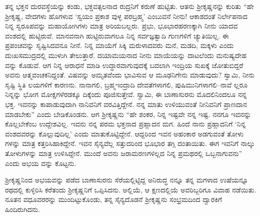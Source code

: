 ತನ್ನ ಭಕ್ತನ ದುರವಸ್ಥೆಯನ್ನು ಕಂಡು, ಭಕ್ತವತ್ಸಲನಾದ ರುದ್ರನಿಗೆ ಕರುಣೆ ಹುಟ್ಟಿತು. ಆತನು ಶ್ರೀಕೃಷ್ಣನನ್ನು ಕುರಿತು “ಹೇ ಶ್ರೀಕೃಷ್ಣ, ವೇದಗಳು ಹೊಗಳುವ ‘ಸ್ವಯಂ ಪ್ರಕಾಶ ವುಳ್ಳ ಪರಬ್ರಹ್ಮ’ ಎಂಬುವನೆ ನೀನು! ಆಕಾಶದಂತೆ ನಿರ್ಲೇಪನಾದ ನಿನ್ನ ಸ್ವರೂಪವನ್ನು ಮಹಾಯೋಗಿಗಳು ಮಾತ್ರ ಅರಿಯಬಲ್ಲರು. ಪ್ರಭು, ಭೂಭಾರಹರಣಕ್ಕಾಗಿ ನೀನು ಯಾದವ ವಂಶದಲ್ಲಿ ಹುಟ್ಟಿರುವೆ. ಮಾನವನಾಗಿ ಹುಟ್ಟಿರುವಾಗಲೂ ನಿನ್ನ ಸರ್ವಜ್ಞತ್ವಾದಿ ಗುಣಗಳಿಗೆ ಚ್ಯುತಿಯಿಲ್ಲ. ಈ ಪ್ರಪಂಚವನ್ನು ಸೃಷ್ಟಿಸಿದವನೂ ನೀನೆ. ನಿನ್ನ ಮಾಯೆಗೆ ಸಿಕ್ಕಿ ಮರುಳಾದವರು ಮನೆ, ಮಡದಿ, ಮಕ್ಕಳು ಎಂದು ದುಃಖಸಮುದ್ರದಲ್ಲಿ ಮುಳುಗಿ ತೇಲುತ್ತಾರೆ. ದಯಾಮಯನಾದ ನೀನು ಮಾಯೆಯನ್ನು ದಾಟಲೆಂದು ಮನುಷ್ಯದೇಹ ವನ್ನು ಕೊಡುವೆ. ಆಗ ನಿನ್ನ ಆರಾಧನೆ ಮಾಡಿ ಉದ್ಧಾರವಾಗುವುದಕ್ಕೆ ಬದಲಾಗಿ ಇಂದ್ರಿಯ ಸುಖಕ್ಕೆ ಜೋತುಬಿದ್ದರೆ ಅವನು ಆತ್ಮವಂಚಕನಿದ್ದಂತೆ. ವಿಷವನ್ನು ಅಮೃತವೆಂದು ಭಾವಿಸುವ ಆ ಮೂಢನಿಗೇನು ಮಾಡುವುದು? ಸ್ವಾಮಿ, ನೀನು ಸೃಷ್ಟಿ ಸ್ಥಿತಿ ಲಯಗಳಿಗೆ ಕಾರಣನು. ನಾನಾಗಲಿ, ಬ್ರಹ್ಮಇಂದ್ರಾದಿ ದೇವತೆಗಳಾಗಲಿ, ಪುಷಿಮುನಿಗಳಾಗಲಿ–ನಾವೆ ಲ್ಲರೂ ನಿನ್ನನ್ನು ಭೋಗ ಮೋಕ್ಷಗಳೆರಡಕ್ಕೂ ದಿಕ್ಕೆಂದು ಪೂಜಿಸುತ್ತೇವೆ. ಸ್ವಾಮಿ, ಈ ಬಾಣಾಸುರನು ಮೊದಲಿನಿಂದಲೂ ನನ್ನ ಭಕ್ತ. ಇವನನ್ನು ಕಾಪಾಡುವುದಾಗಿ ನಾನಿವನಿಗೆ ವರವಿತ್ತಿದ್ದೇನೆ. ನನ್ನ ಮಾತು ಉಳಿಯುವಂತೆ ನೀನಿವನಿಗೆ ಪ್ರಾಣದಾನ ಮಾಡಬೇಕು” ಎಂದು ಬೇಡಿಕೊಂಡನು. ಆಗ ಶ್ರೀಕೃಷ್ಣನು “ಹೇ ಶಂಕರ, ನಿನ್ನ ಇಷ್ಟವೇ ನನ್ನ ಇಷ್ಟ. ನನಗೂ ಇವನನ್ನು ಕೊಲ್ಲಬೇಕೆಂಬ ಉದ್ದೇಶವಿಲ್ಲ. ಇವನು ನನ್ನ ಪರಮ ಭಕ್ತನಾದ ಪ್ರಹ್ಲಾದನ ಮಗ. ಹಿಂದೆ ನಾನು ಪ್ರಹ್ಲಾದನಿಗೆ ‘ನಿನ್ನ ವಂಶದವರನ್ನು ಕೊಲ್ಲುವುದಿಲ್ಲ’ ಎಂದು ಮಾತುಕೊಟ್ಟಿದ್ದೇನೆ. ಆದ್ದರಿಂದ ಇವನ ಅಹಂಕಾರ ಅಡಗುವಂತೆ ತೋಳು ಗಳನ್ನು ಮಾತ್ರ ಕತ್ತರಿಸಿಹಾಕಿದ್ದೇನೆ. ಇವನ ಸೈನ್ಯವೆಲ್ಲ ಸತ್ತುದರಿಂದ ಭೂಭಾರ ತಗ್ಗಿ ದಂತಾಯಿತು. ಈಗ ಇವನಿಗೆ ನಾಲ್ಕು ತೋಳುಗಳನ್ನು ಮಾತ್ರ ಉಳಿಸಿದ್ದೇನೆ. ಮುಂದೆ ಅವನು ಜರಾಮರಣಗಳಿಲ್ಲದ ನಿನ್ನ ಪ್ರಮಥರಲ್ಲಿ ಒಬ್ಬನಾಗುವನು” ಎಂದು ಅಭಯ ವನ್ನು ಕೊಟ್ಟನು.

ಶ್ರೀಕೃಷ್ಣನಿಂದ ಅಭಯವನ್ನು ಪಡೆದ ಬಾಣಾಸುರನು ಸೆರೆಯಲ್ಲಿಟ್ಟಿದ್ದ ಅನಿರುದ್ಧ ನನ್ನೂ ತನ್ನ ಮಗಳಾದ ಉಷೆಯನ್ನೂ ರಥದಲ್ಲಿ ಕುಳ್ಳಿರಿಸಿ ಕರೆತಂದು ಶ್ರೀಕೃಷ್ಣನಿಗೆ ಒಪ್ಪಿಸಿದನು. ಅಲ್ಲಿಯೆ, ಆ ಕ್ಷಣದಲ್ಲಿಯೆ ಅವರಿಬ್ಬರಿಗೂ ವಿವಾಹ ನಡೆಯಿತು. ನೂತನ ವಧೂವರರನ್ನು ಮುಂದಿಟ್ಟುಕೊಂಡು, ತನ್ನ ಸೈನ್ಯದೊಡನೆ ಶ್ರೀಕೃಷ್ಣನು ಸಂಭ್ರಮದಿಂದ ದ್ವಾರಕಿಗೆ ಹಿಂದಿರುಗಿದನು.


